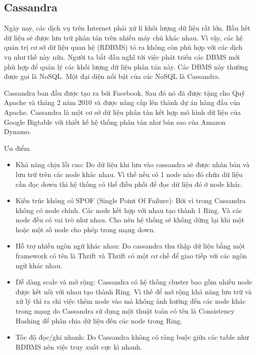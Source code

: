 \begin{itemize}
            \subsection{Cassandra}
            
            Ngày nay, các dịch vụ trên Internet phải xử lí khối lượng dữ liệu rất lớn. Hầu hết dữ liệu sẽ được lưu trữ phân tán trên nhiều máy chủ khác nhau. Vì vậy, các hệ quản trị cơ sở dữ liệu quan hệ (RDBMS) tỏ ra không còn phù hợp với các dịch vụ như thế này nữa. Người ta bắt đầu nghĩ tới việc phát triển các DBMS mới phù hợp để quản lý các khối lượng dữ liệu phân tán này. Các DBMS này thường được gọi là NoSQL. Một đại diện nổi bật của các NoSQL là Cassandra.
            
            Cassandra ban đầu được tạo ra bởi Facebook. Sau đó nó đã được tặng cho Quỹ Apache và tháng 2 năm 2010 và được nâng cấp lên thành dự án hàng đầu của Apache. Cassandra là một cơ sở dữ liệu phân tán kết hợp mô hình dữ liệu của Google Bigtable với thiết kế hệ thống phân tán như bản sao của Amazon Dynamo. 
            
            Ưu điểm
            
            \begin{itemize}
                \item Khả năng chịu lỗi cao: Do dữ liệu khi lưu vào cassandra sẽ được nhân bản và lưu trữ trên các node khác nhau. Vì thế nếu có 1 node nào đó chứa dữ liệu cần đọc down thì hệ thống có thể điều phối để đọc dữ liệu đó ở node khác.
                \item Kiến trúc không có SPOF (Single Point Of Failure): Bởi vì trong Cassandra không có node chính. Các node kết hợp với nhau tạo thành 1 Ring. Và các node đều có vai trò như nhau. Cho nên hệ thống sẽ không dừng lại khi một hoặc một số node cho phép trong mạng down.
                \item Hỗ trợ nhiều ngôn ngữ khác nhau: Do cassandra thu thập dữ liệu bằng một framework có tên là Thrift và Thrift có một cơ chế để giao tiếp với các ngôn ngữ khác nhau.
                \item Dễ dàng scale và mở rộng: Cassandra có hệ thống cluster bao gồm nhiều node được kết nối với nhau tạo thành Ring. Vì thế để mở rộng khả năng lưu trữ và xử lý thì ra chỉ việc thêm node vào mà không ảnh hưởng đến các node khác trong mạng do Cassandra sử dụng một thuật toán có tên là Consistency Hashing để phân chia dữ liệu đến các node trong Ring.
                \item Tốc độ đọc/ghi nhanh: Do Cassandra không có ràng buộc giữa các table như RDBMS nên việc truy xuất cực kì nhanh.
            \end{itemize}
            

\end{itemize}
